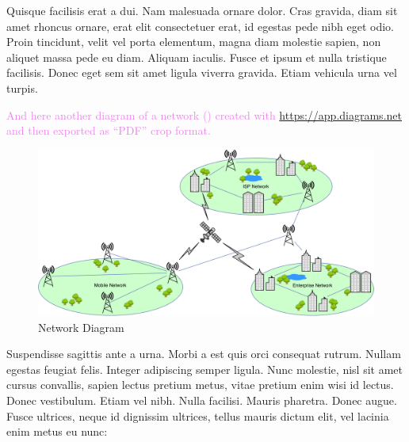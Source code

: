 Quisque facilisis erat a dui. Nam malesuada ornare dolor. Cras gravida, diam sit amet rhoncus ornare, erat elit consectetuer erat, id egestas pede nibh eget odio. Proin tincidunt, velit vel porta elementum, magna diam molestie sapien, non aliquet massa pede eu diam. Aliquam iaculis. Fusce et ipsum et nulla tristique facilisis. Donec eget sem sit amet ligula viverra gravida. Etiam vehicula urna vel turpis. 

\textcolor{violet}{And here another diagram of a network () created with \url{https://app.diagrams.net} and then exported as ``PDF'' crop format.}

\begin{figure}[h]
\centering
\includegraphics[width=1.0\textwidth]{./Images/Network_from_draw-io.pdf}
\caption{Network Diagram}
\label{fig:network}
\end{figure}

Suspendisse sagittis ante a urna. Morbi a est quis orci consequat rutrum. Nullam egestas feugiat felis. Integer adipiscing semper ligula. Nunc molestie, nisl sit amet cursus convallis, sapien lectus pretium metus, vitae pretium enim wisi id lectus. Donec vestibulum. Etiam vel nibh. Nulla facilisi. Mauris pharetra. Donec augue. Fusce ultrices, neque id dignissim ultrices, tellus mauris dictum elit, vel lacinia enim metus eu nunc:

